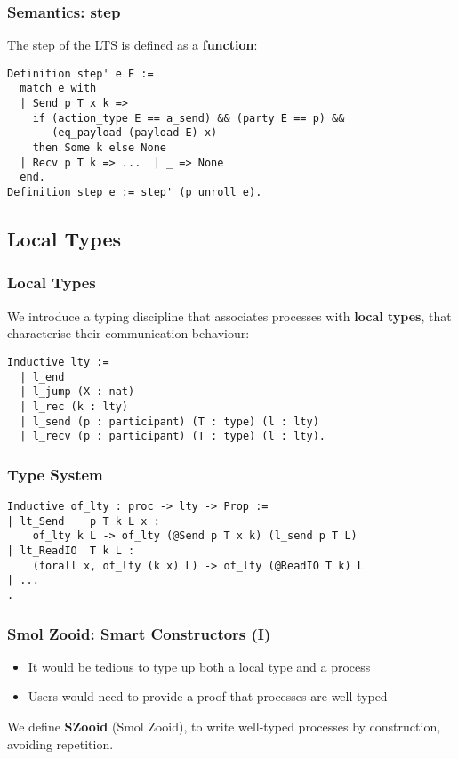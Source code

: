 \begin{frame}[fragile]
    \frametitle{Semantics: step}
The step of the LTS is defined as a \textbf{function}:
\vspace{.5cm}
    \begin{verbatim}
Definition step' e E :=
  match e with
  | Send p T x k =>
    if (action_type E == a_send) && (party E == p) &&
       (eq_payload (payload E) x)
    then Some k else None
  | Recv p T k => ...  | _ => None
  end.
Definition step e := step' (p_unroll e).
    \end{verbatim}
\end{frame}

\subsection{Local Types}

\begin{frame}[fragile]
    \frametitle{Local Types}
    We introduce a typing discipline that associates processes with \textbf{local types}, that 
characterise their communication behaviour:

    \begin{verbatim}
Inductive lty :=
  | l_end
  | l_jump (X : nat)
  | l_rec (k : lty)
  | l_send (p : participant) (T : type) (l : lty)
  | l_recv (p : participant) (T : type) (l : lty).
    \end{verbatim}
\end{frame}

\begin{frame}[fragile]
    \frametitle{Type System}
    \begin{verbatim}
Inductive of_lty : proc -> lty -> Prop :=
| lt_Send    p T k L x :
    of_lty k L -> of_lty (@Send p T x k) (l_send p T L)
| lt_ReadIO  T k L :
    (forall x, of_lty (k x) L) -> of_lty (@ReadIO T k) L
| ...
.
    \end{verbatim}
\end{frame}

\begin{frame}[fragile]
    \frametitle{Smol Zooid: Smart Constructors (I)}
    \begin{sticky}
\vspace{-.5cm}
    \begin{itemize}
        \item It would be tedious to type up both a local type and a process
        \item Users would need to provide a proof that processes are well-typed
    \end{itemize}
    \end{sticky}
    \begin{greenbox}{}
        We define \textbf{SZooid} (Smol Zooid), to write
well-typed processes by construction, avoiding repetition.
    \end{greenbox}
\end{frame}

